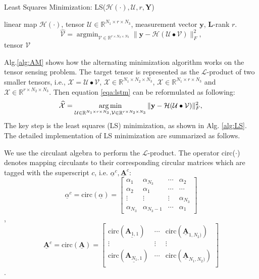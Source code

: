 \documentclass[futureinternet,article,submit,moreauthors,pdftex,10pt,a4paper]{Definitions/mdpi}
\theoremstyle{plain}
\theoremstyle{definition}
\theoremstyle{remark}
\begin{document}
\begin{algorithm}[htb]
    \caption{Least Squares Minimization: LS($\mathcal{H}(\cdot), \mathcal{U}, r, \mathbf{Y}$)}
    \label{alg:LS}
    \begin{algorithmic}[2]
        \Require
        linear map $\mathcal{H}(\cdot)$, tensor $\mathcal{U} \in \mathbb{R}^{N_1\times r \times N_3}$, measurement vector $\mathbf{y}$, $\mathbf{L}$-rank $r$.
    \State \[
    \widehat{\mathcal{V}} = \mathop{\arg\min}_{\mathcal{V} \in \mathbb{R}^{r \times N_2 \times N_3}}\| \mathbf{y} - \mathcal{H}(\mathcal{U} \bullet \mathcal{V}) \|_F^2 , 
    \]
    \Ensure tensor $\mathcal{V}$
    \end{algorithmic}
\end{algorithm}
Alg.\ref{alg:AM} shows how the alternating minimization algorithm works on the tensor sensing problem. The target tensor is represented as the $\mathcal{L}$-product of two smaller tensors, i.e., $\mathcal{X} = \mathcal{U} \bullet \mathcal{V}$, $\mathcal{X} \in \mathbb{R}^{N_1 \times N_2 \times N_3}$, $\mathcal{X} \in \mathbb{R}^{N_1 \times r \times N_3}$ and $\mathcal{X} \in \mathbb{R}^{r \times N_2 \times N_3}$.
Then equation \eqref{eqa:lstm} can be reformulated as following:
\begin{equation}
    \widehat{\mathcal{X}} =
    \mathop{\arg\min}_{ \mathcal{U} \in \mathbb{R}^{N_1 \times r \times N_3}, \mathcal{V} \in \mathbb{R}^{r \times N_2 \times N_3}}\| \mathbf{y} - \mathcal{H}(\mathcal{U} \bullet \mathcal{V}) \|_F^2 , \\
\end{equation}
The key step is the least squares (LS) minimization, as shown in Alg. \ref{alg:LS}. The detailed implementation of LS minimization are summarized as follows.

We use the circulant algebra \cite{liu2016low} \cite{gleich2013power} to perform the $\mathcal{L}$-product. The operator circ($\cdot$) denotes mapping circulants to their corresponding circular matrices which are tagged with the superscript $c$, i.e. $\underline{\alpha}^c, \underline{\mathbf{A}}^c$:
\[
    \underline{\alpha}^c = \text{circ}(\underline{\alpha}) = \begin{bmatrix}
        \alpha_1 & \alpha_{N_3} & \cdots  & \alpha_2 \\
        \alpha_2 & \alpha_1 & \cdots & \cdots \\
        \vdots & \vdots & \vdots & \alpha_{N_3} \\
        \alpha_{N_3} & \alpha_{N_3-1} & \cdots & \alpha_1
    \end{bmatrix}
    \],
    \[
        \underline{\mathbf{A}}^c = \text{circ}(\underline{\mathbf{A}}) = \begin{bmatrix}
            \text{circ}(\underline{\mathbf{A}_{1,1}})  & \cdots & \text{circ}(\underline{\mathbf{A}}_{1,N_2)}) \\
            \vdots & \vdots & \vdots \\
            \text{circ}(\underline{\mathbf{A}_{N_1,1}})  & \cdots & \text{circ}(\underline{\mathbf{A}}_{N_1,N_2)}) \\
        \end{bmatrix}
        \].
\end{document}
